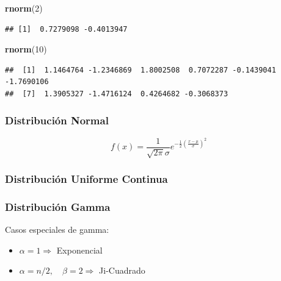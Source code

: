 \documentclass[]{article}
\newenvironment{Shaded}{\begin{snugshade}}{\end{snugshade}}
\newcommand{\DecValTok}[1]{\textcolor[rgb]{0.00,0.00,0.81}{#1}}
\newcommand{\KeywordTok}[1]{\textcolor[rgb]{0.13,0.29,0.53}{\textbf{#1}}}
\newcommand{\NormalTok}[1]{#1}
\begin{document}
\begin{Shaded}
\begin{Highlighting}[]
\KeywordTok{rnorm}\NormalTok{(}\DecValTok{2}\NormalTok{)}
\end{Highlighting}
\end{Shaded}

\begin{verbatim}
## [1]  0.7279098 -0.4013947
\end{verbatim}

\begin{Shaded}
\begin{Highlighting}[]
\KeywordTok{rnorm}\NormalTok{(}\DecValTok{10}\NormalTok{)}
\end{Highlighting}
\end{Shaded}

\begin{verbatim}
##  [1]  1.1464764 -1.2346869  1.8002508  0.7072287 -0.1439041 -1.7690106
##  [7]  1.3905327 -1.4716124  0.4264682 -0.3068373
\end{verbatim}

\hypertarget{distribucion-normal}{%
\subsubsection{Distribución Normal}\label{distribucion-normal}}

\[ f(x) = \frac{1}{\sqrt{2 \pi} \sigma} e^{-\frac{1}{2} \left( \frac{x - \mu}{\sigma} \right)^2} \]

\hypertarget{distribucion-uniforme-continua}{%
\subsubsection{Distribución Uniforme
Continua}\label{distribucion-uniforme-continua}}

\hypertarget{distribucion-gamma}{%
\subsubsection{Distribución Gamma}\label{distribucion-gamma}}

Casos especiales de gamma:

\begin{itemize}
\item
  \(\alpha = 1 \Rightarrow\) Exponencial
\item
  \(\alpha = n/2, \quad \beta = 2 \Rightarrow\) Ji-Cuadrado
\end{itemize}
\end{document}
